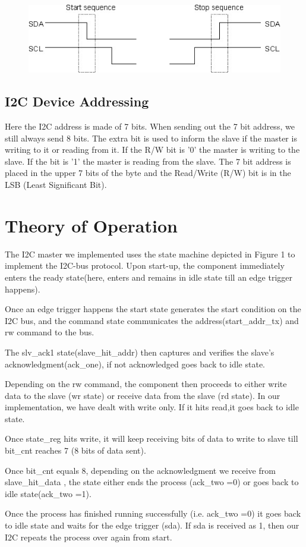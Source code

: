 \documentclass[12pt,twocolumn]{IEEEtran}
\begin{document}
  \begin{figure}[H]
    \includegraphics[width=0.5\linewidth]{start_stop_seq.jpeg}
  \end{figure}




    \subsection{I2C Device Addressing}
	Here the I2C address is made of 7 bits. When sending out the 7 bit address, we still always send 8 bits. The extra bit is used to inform the slave if the master is  writing to it or reading from it. If the R/W bit is '0' the master is writing to the slave. If the bit is '1' the master is reading from the slave. The 7 bit address is placed in the upper 7 bits of the byte and the Read/Write (R/W) bit is in the LSB (Least Significant Bit).

  \section{Theory of Operation}
    The I2C master we implemented uses the state machine depicted in Figure 1 to implement the I2C-bus protocol. Upon start-up, the component immediately
    enters the ready state(here, enters and remains in idle state till an edge trigger happens). 

    Once an edge trigger happens the start state generates the start condition on the I2C bus, and the command state communicates the address(start\_addr\_tx) 
    and rw command to the bus. 

    The slv\_ack1 state(slave\_hit\_addr) then captures and verifies the slave’s acknowledgment(ack\_one), if not acknowledged goes back to idle state. 

    Depending on the rw command, the component then proceeds to either write data to the slave (wr state) or receive data from the slave (rd state). 
    In our implementation, we have dealt with write only. If it hits read,it goes back to idle state.

    Once state\_reg hits write, it will keep receiving bits of data to write to slave till bit\_cnt reaches 7 (8 bits of data sent).

    Once bit\_cnt equals 8, depending on the acknowledgment we receive from slave\_hit\_data , the state either ends the process (ack\_two =0) or goes back 
    to idle state(ack\_two =1). 

    Once the process has finished running successfully (i.e. ack\_two =0) it goes back to idle state and waits for the edge trigger (sda). If sda is received 
    as 1, then our I2C repeats the process over again from start.

  
\end{document}
